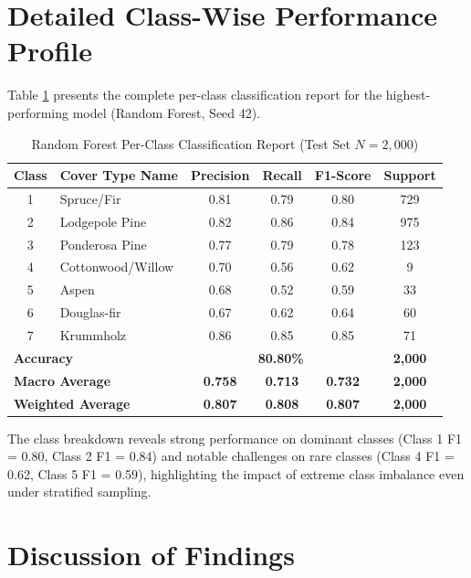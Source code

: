 \section{Detailed Class-Wise Performance Profile}
\label{sec:class_breakdown}

Table \ref{tab:classification_report} presents the complete per-class classification report for the highest-performing model (Random Forest, Seed 42).

\begin{table}[H]
\centering
\caption{Random Forest Per-Class Classification Report (Test Set $N = 2,000$)}
\label{tab:classification_report}
\begin{tabular}{clcccc}
\toprule
\textbf{Class} & \textbf{Cover Type Name} & \textbf{Precision} & \textbf{Recall} & \textbf{F1-Score} & \textbf{Support} \\
\midrule
1 & Spruce/Fir & 0.81 & 0.79 & 0.80 & 729 \\
2 & Lodgepole Pine & 0.82 & 0.86 & 0.84 & 975 \\
3 & Ponderosa Pine & 0.77 & 0.79 & 0.78 & 123 \\
4 & Cottonwood/Willow & 0.70 & 0.56 & 0.62 & 9 \\
5 & Aspen & 0.68 & 0.52 & 0.59 & 33 \\
6 & Douglas-fir & 0.67 & 0.62 & 0.64 & 60 \\
7 & Krummholz & 0.86 & 0.85 & 0.85 & 71 \\
\midrule
\multicolumn{2}{l}{\textbf{Accuracy}} & \multicolumn{3}{c}{\textbf{80.80\%}} & \textbf{2,000} \\
\multicolumn{2}{l}{\textbf{Macro Average}} & \textbf{0.758} & \textbf{0.713} & \textbf{0.732} & \textbf{2,000} \\
\multicolumn{2}{l}{\textbf{Weighted Average}} & \textbf{0.807} & \textbf{0.808} & \textbf{0.807} & \textbf{2,000} \\
\bottomrule
\end{tabular}
\end{table}

The class breakdown reveals strong performance on dominant classes (Class 1 F1 = 0.80, Class 2 F1 = 0.84) and notable challenges on rare classes (Class 4 F1 = 0.62, Class 5 F1 = 0.59), highlighting the impact of extreme class imbalance even under stratified sampling.

\section{Discussion of Findings}
\label{sec:discussion}

